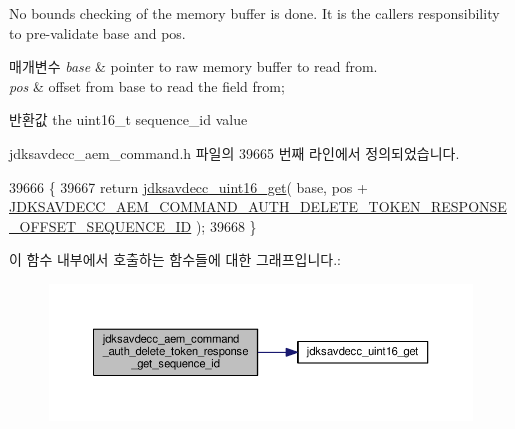 No bounds checking of the memory buffer is done. It is the caller\textquotesingle{}s responsibility to pre-\/validate base and pos.


\begin{DoxyParams}{매개변수}
{\em base} & pointer to raw memory buffer to read from. \\
\hline
{\em pos} & offset from base to read the field from; \\
\hline
\end{DoxyParams}
\begin{DoxyReturn}{반환값}
the uint16\+\_\+t sequence\+\_\+id value 
\end{DoxyReturn}


jdksavdecc\+\_\+aem\+\_\+command.\+h 파일의 39665 번째 라인에서 정의되었습니다.


\begin{DoxyCode}
39666 \{
39667     \textcolor{keywordflow}{return} \hyperlink{group__endian_ga3fbbbc20be954aa61e039872965b0dc9}{jdksavdecc\_uint16\_get}( base, pos + 
      \hyperlink{group__command__auth__delete__token__response_gaee2b9e2790b9e33c1169d8980b30b36c}{JDKSAVDECC\_AEM\_COMMAND\_AUTH\_DELETE\_TOKEN\_RESPONSE\_OFFSET\_SEQUENCE\_ID}
       );
39668 \}
\end{DoxyCode}


이 함수 내부에서 호출하는 함수들에 대한 그래프입니다.\+:
\nopagebreak
\begin{figure}[H]
\begin{center}
\leavevmode
\includegraphics[width=350pt]{group__command__auth__delete__token__response_gad821e27a3a4630e0878ae8e2ff8d25cb_cgraph}
\end{center}
\end{figure}


